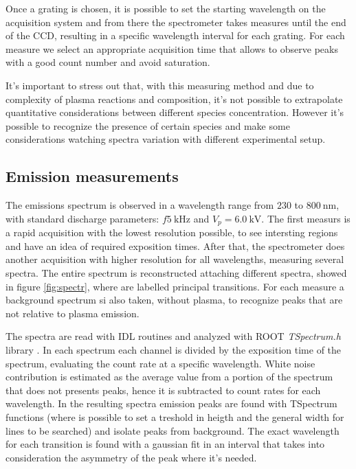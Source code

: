 Once a grating is chosen, it is possible to set the starting wavelength on the acquisition system and from there the spectrometer takes measures until the end of the CCD, resulting in a specific wavelength interval for each grating.
For each measure we select an appropriate acquisition time that allows to observe peaks with a good count number and avoid saturation.

It's important to stress out that, with this measuring method and due to complexity of plasma reactions and composition, it's not possible to extrapolate quantitative considerations between different species concentration. However it's possible to recognize the presence of certain species and make some considerations watching spectra variation with different experimental setup.


\subsection{Emission measurements}
The emissions spectrum is observed in a wavelength range from $\num{230}$ to $\SI{800}{\nano\meter}$, with standard discharge parameters: $f \SI{5}{\kilo\hertz}$ and $V_{p} = \SI{6.0}{\kilo\volt}$.
The first measurs is a rapid acquisition with the lowest resolution possible, to see intersting regions and have an idea of required exposition times. After that, the spectrometer does another acquisition with higher resolution for all wavelengths, measuring several spectra. The entire spectrum is reconstructed attaching different spectra, showed in figure \ref{fig:spectr}, where are labelled principal transitions.
For each measure a background spectrum si also taken, without plasma, to recognize peaks that are not relative to plasma emission.

The spectra are read with IDL routines \cite{GUMLEY200215} and analyzed with ROOT \emph{TSpectrum.h} library \cite{ROOT:TSpectrum}.
In each spectrum each channel is divided by the exposition time of the spectrum, evaluating the count rate at a specific wavelength.
White noise contribution is estimated as the average value from a portion of the spectrum that does not presents peaks, hence it is subtracted to count rates for each wavelength.
In the resulting spectra emission peaks are found with TSpectrum functions (where is possible to set a treshold in heigth and the general width for lines to be searched) and isolate peaks from background. The exact wavelength for each transition is found with a gaussian fit in an interval that takes into consideration the asymmetry of the peak where it's needed.

